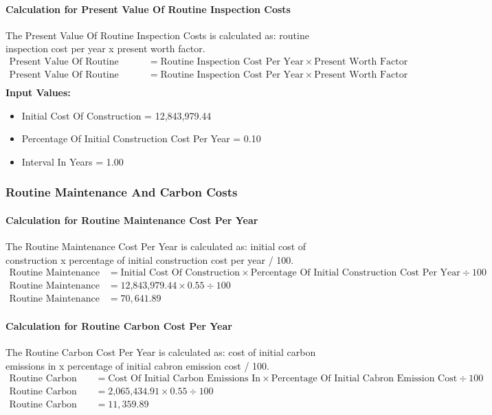 \documentclass{article}
\begin{document}
 \paragraph{Calculation for Present Value Of Routine Inspection Costs} 
The Present Value Of Routine Inspection Costs is calculated as: routine inspection cost per year x present worth factor.
\begin{align*}
 \text{Present Value Of Routine Inspection Costs} &= \text{Routine Inspection Cost Per Year} \times \text{Present Worth Factor} \\
 \text{Present Value Of Routine Inspection Costs} &= \text{Routine Inspection Cost Per Year} \times \text{Present Worth Factor} \\
\end{align*}
\textbf{Input Values:}
\begin{itemize}
\item Initial Cost Of Construction = 12,843,979.44
\item Percentage Of Initial Construction Cost Per Year = 0.10
\item Interval In Years = 1.00
\end{itemize}
\subsubsection{Routine Maintenance And Carbon Costs}
 \paragraph{Calculation for Routine Maintenance Cost Per Year} 
The Routine Maintenance Cost Per Year is calculated as: initial cost of construction x percentage of initial construction cost per year / 100.
\begin{align*}
 \text{Routine Maintenance Cost Per Year} &= \text{Initial Cost Of Construction} \times \text{Percentage Of Initial Construction Cost Per Year} \div 100 \\
 \text{Routine Maintenance Cost Per Year} &= \text{12,843,979.44} \times 0.55 \div 100 \\
 \text{Routine Maintenance Cost Per Year} &= 70,641.89 
\end{align*}
 \paragraph{Calculation for Routine Carbon Cost Per Year} 
The Routine Carbon Cost Per Year is calculated as: cost of initial carbon emissions in x percentage of initial cabron emission cost / 100.
\begin{align*}
 \text{Routine Carbon Cost Per Year} &= \text{Cost Of Initial Carbon Emissions In} \times \text{Percentage Of Initial Cabron Emission Cost} \div 100 \\
 \text{Routine Carbon Cost Per Year} &= \text{2,065,434.91} \times 0.55 \div 100 \\
 \text{Routine Carbon Cost Per Year} &= 11,359.89 
\end{align*}
\end{document}
